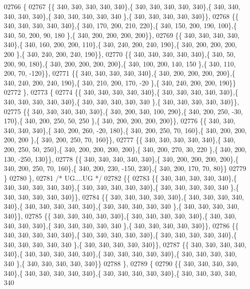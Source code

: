 \begin{DoxyCode}
02766 \{
02767 \{\{ 340, 340, 340, 340, 340\},\{ 340, 340, 340, 340, 340\},\{ 340, 340, 340, 340, 340\},\{ 340, 340, 340, 340, 340
      \},\{ 340, 340, 340, 340, 340\}\},
02768 \{\{ 340, 340, 340, 340, 340\},\{ 340, 170, 200, 210, 220\},\{ 340, 150, 200, 190, 100\},\{ 340,  50, 200,  90, 180
      \},\{ 340, 200, 200, 200, 200\}\},
02769 \{\{ 340, 340, 340, 340, 340\},\{ 340, 160, 200, 200, 110\},\{ 340, 240, 200, 240, 190\},\{ 340, 200, 200, 200, 200
      \},\{ 340, 240, 200, 240, 190\}\},
02770 \{\{ 340, 340, 340, 340, 340\},\{ 340,  50, 200,  90, 180\},\{ 340, 200, 200, 200, 200\},\{ 340, 100, 200, 140, 150
      \},\{ 340, 110, 200,  70, -120\}\},
02771 \{\{ 340, 340, 340, 340, 340\},\{ 340, 200, 200, 200, 200\},\{ 340, 240, 200, 240, 190\},\{ 340, 210, 200, 170, -20
      \},\{ 340, 240, 200, 200, 190\}\}
02772 \},
02773 \{
02774 \{\{ 340, 340, 340, 340, 340\},\{ 340, 340, 340, 340, 340\},\{ 340, 340, 340, 340, 340\},\{ 340, 340, 340, 340, 340
      \},\{ 340, 340, 340, 340, 340\}\},
02775 \{\{ 340, 340, 340, 340, 340\},\{ 340, 200, 340, 100, 290\},\{ 340, 200, 250, -30, 170\},\{ 340, 200, 250,  50, 250
      \},\{ 340, 200, 200, 200, 200\}\},
02776 \{\{ 340, 340, 340, 340, 340\},\{ 340, 200, 260, -20, 180\},\{ 340, 200, 250,  70, 160\},\{ 340, 200, 200, 200, 200
      \},\{ 340, 200, 250,  70, 160\}\},
02777 \{\{ 340, 340, 340, 340, 340\},\{ 340, 200, 250,  50, 250\},\{ 340, 200, 200, 200, 200\},\{ 340, 200, 270,  30, 220
      \},\{ 340, 200, 130, -250, 130\}\},
02778 \{\{ 340, 340, 340, 340, 340\},\{ 340, 200, 200, 200, 200\},\{ 340, 200, 250,  70, 160\},\{ 340, 200, 230, -150, 
      230\},\{ 340, 200, 170,  70,  80\}\}
02779 \}
02780 \},
02781 \textcolor{comment}{/* UG....UG */}
02782 \{\{
02783 \{\{ 340, 340, 340, 340, 340\},\{ 340, 340, 340, 340, 340\},\{ 340, 340, 340, 340, 340\},\{ 340, 340, 340, 340, 340
      \},\{ 340, 340, 340, 340, 340\}\},
02784 \{\{ 340, 340, 340, 340, 340\},\{ 340, 340, 340, 340, 340\},\{ 340, 340, 340, 340, 340\},\{ 340, 340, 340, 340, 340
      \},\{ 340, 340, 340, 340, 340\}\},
02785 \{\{ 340, 340, 340, 340, 340\},\{ 340, 340, 340, 340, 340\},\{ 340, 340, 340, 340, 340\},\{ 340, 340, 340, 340, 340
      \},\{ 340, 340, 340, 340, 340\}\},
02786 \{\{ 340, 340, 340, 340, 340\},\{ 340, 340, 340, 340, 340\},\{ 340, 340, 340, 340, 340\},\{ 340, 340, 340, 340, 340
      \},\{ 340, 340, 340, 340, 340\}\},
02787 \{\{ 340, 340, 340, 340, 340\},\{ 340, 340, 340, 340, 340\},\{ 340, 340, 340, 340, 340\},\{ 340, 340, 340, 340, 340
      \},\{ 340, 340, 340, 340, 340\}\}
02788 \},
02789 \{
02790 \{\{ 340, 340, 340, 340, 340\},\{ 340, 340, 340, 340, 340\},\{ 340, 340, 340, 340, 340\},\{ 340, 340, 340, 340, 340

\end{DoxyCode}
